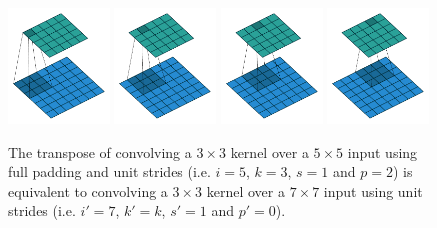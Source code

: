 \documentclass{report}
\begin{document}
\begin{figure}[p]
    \centering
    \includegraphics[width=0.24\textwidth]{pdf/full_padding_no_strides_transposed_00.pdf}
    \includegraphics[width=0.24\textwidth]{pdf/full_padding_no_strides_transposed_01.pdf}
    \includegraphics[width=0.24\textwidth]{pdf/full_padding_no_strides_transposed_02.pdf}
    \includegraphics[width=0.24\textwidth]{pdf/full_padding_no_strides_transposed_03.pdf}
    \caption{\label{fig:full_padding_no_strides_transposed} The transpose
        of convolving a $3 \times 3$ kernel over a $5 \times 5$ input using full
        padding and unit strides (i.e. $i = 5$, $k = 3$, $s = 1$ and $p = 2$) is
        equivalent to convolving a $3 \times 3$ kernel over a $7 \times 7$ input
        using unit strides (i.e. $i' = 7$, $k' = k$, $s' = 1$ and $p' = 0$).}
\end{figure}
\end{document}
